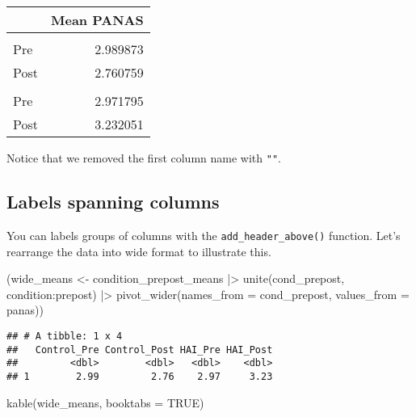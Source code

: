 \documentclass[
  doc]{apa6}
\newenvironment{Shaded}{\begin{snugshade}}{\end{snugshade}}
\newcommand{\AttributeTok}[1]{\textcolor[rgb]{0.77,0.63,0.00}{#1}}
\newcommand{\ConstantTok}[1]{\textcolor[rgb]{0.00,0.00,0.00}{#1}}
\newcommand{\FunctionTok}[1]{\textcolor[rgb]{0.00,0.00,0.00}{#1}}
\newcommand{\NormalTok}[1]{#1}
\newcommand{\OtherTok}[1]{\textcolor[rgb]{0.56,0.35,0.01}{#1}}
\newcommand{\SpecialCharTok}[1]{\textcolor[rgb]{0.00,0.00,0.00}{#1}}
\begin{document}
\begin{tabular}{lr}
\toprule
 & Mean PANAS\\
\midrule
\addlinespace[0.3em]
\multicolumn{2}{l}{\textbf{Control}}\\
\hspace{1em}Pre & 2.989873\\
\hspace{1em}Post & 2.760759\\
\addlinespace[0.3em]
\multicolumn{2}{l}{\textbf{HAI}}\\
\hspace{1em}Pre & 2.971795\\
\hspace{1em}Post & 3.232051\\
\bottomrule
\end{tabular}

Notice that we removed the first column name with \texttt{""}.

\newpage

\hypertarget{labels-spanning-columns}{%
\subsection{Labels spanning columns}\label{labels-spanning-columns}}

You can labels groups of columns with the \texttt{add\_header\_above()} function. Let's rearrange the data into wide format to illustrate this.

\begin{Shaded}
\begin{Highlighting}[]
\NormalTok{(wide\_means }\OtherTok{\textless{}{-}}\NormalTok{ condition\_prepost\_means }\SpecialCharTok{|\textgreater{}}
   \FunctionTok{unite}\NormalTok{(cond\_prepost, condition}\SpecialCharTok{:}\NormalTok{prepost) }\SpecialCharTok{|\textgreater{}}
   \FunctionTok{pivot\_wider}\NormalTok{(}\AttributeTok{names\_from =}\NormalTok{ cond\_prepost, }\AttributeTok{values\_from =}\NormalTok{ panas))}
\end{Highlighting}
\end{Shaded}

\begin{verbatim}
## # A tibble: 1 x 4
##   Control_Pre Control_Post HAI_Pre HAI_Post
##         <dbl>        <dbl>   <dbl>    <dbl>
## 1        2.99         2.76    2.97     3.23
\end{verbatim}

\begin{Shaded}
\begin{Highlighting}[]
\FunctionTok{kable}\NormalTok{(wide\_means, }\AttributeTok{booktabs =} \ConstantTok{TRUE}\NormalTok{)}
\end{Highlighting}
\end{Shaded}
\end{document}
